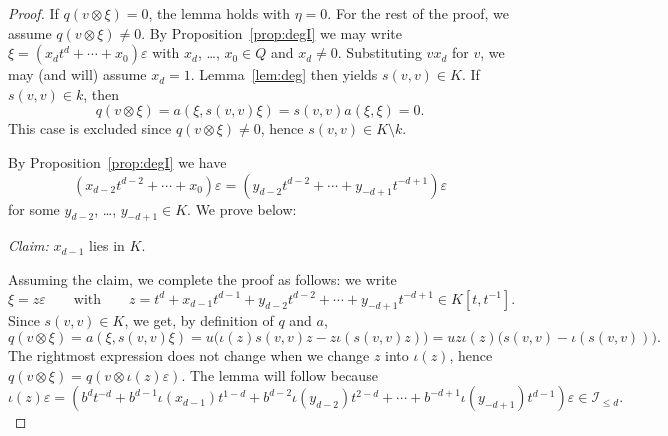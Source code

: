 \documentclass{amsart}
\newcommand{\calI}{\mathcal{I}}
\theoremstyle{remark}
\begin{document}
\begin{proof}
  If $q(v\otimes\xi)=0$, the lemma holds with $\eta=0$. For the rest
  of the proof, we assume $q(v\otimes\xi)\neq0$.
  By Proposition~\ref{prop:degI} we may write
  $\xi=(x_{d}t^{d}+\cdots+x_0)\varepsilon$ with $x_{d}$,
  \ldots, $x_0\in Q$ and $x_{d}\neq 0$. Substituting $vx_d$ for $v$,
  we may (and will) assume $x_d=1$. Lemma~\ref{lem:deg} then yields
  $s(v,v)\in K$. If $s(v,v)\in k$, then
  \[
    q(v\otimes\xi) = a(\xi,s(v,v)\xi) = s(v,v) a(\xi,\xi)=0.
  \]
  This case is excluded since
  $q(v\otimes\xi)\neq0$, hence $s(v,v)\in K\setminus k$.

  By Proposition~\ref{prop:degI} we
  have
  \[
    (x_{d-2}t^{d-2}+\cdots+x_0)\varepsilon = (y_{d-2}t^{d-2}+\cdots +
    y_{-d+1}t^{-d+1})\varepsilon
  \]
  for some $y_{d-2}$, \ldots, $y_{-d+1}\in K$. We prove below:
  \medbreak

  \noindent\textit{Claim:} $x_{d-1}$ lies in $K$.
  \medbreak

  Assuming the claim, we complete the proof as follows: we write
  \[
    \xi=z\varepsilon \qquad\text{with}\qquad
    z=t^d+x_{d-1}t^{d-1}+y_{d-2}t^{d-2}+\cdots+y_{-d+1}t^{-d+1} \in
    K[t,t^{-1}].
  \]
  Since $s(v,v)\in K$, we get, by definition of $q$ and $a$,
  \begin{equation}
    \label{eq:key}
    q(v\otimes\xi) = a(\xi,s(v,v)\xi) = u\bigl(\iota(z)s(v,v)z -
    z\iota(s(v,v)z)\bigr) =
    uz\iota(z)\bigl(s(v,v)-\iota(s(v,v))\bigr).
  \end{equation}
  The rightmost expression does not change when we change $z$ into
  $\iota(z)$, 
  hence $q(v\otimes\xi) = q(v\otimes\iota(z)\varepsilon)$. 
  The lemma will follow because
  \[
    \iota(z)\varepsilon=(b^dt^{-d}+b^{d-1}\iota(x_{d-1})t^{1-d} +
    b^{d-2}\iota(y_{d-2}) t^{2-d} + \cdots +
    b^{-d+1}\iota(y_{-d+1})t^{d-1})\varepsilon \in \calI_{\leq d}.
  \]
  \medbreak


\end{proof}
\end{document}
